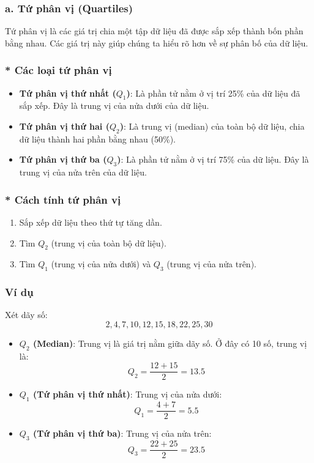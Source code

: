 \subsubsection{a. Tứ phân vị (Quartiles)}
Tứ phân vị là các giá trị chia một tập dữ liệu đã được sắp xếp thành bốn phần bằng nhau. Các giá trị này giúp chúng ta hiểu rõ hơn về sự phân bố của dữ liệu.

\subsubsection*{* Các loại tứ phân vị}
\begin{itemize}
    \item \textbf{Tứ phân vị thứ nhất ($Q_1$)}: Là phần tử nằm ở vị trí 25\% của dữ liệu đã sắp xếp. Đây là trung vị của nửa dưới của dữ liệu.
    \item \textbf{Tứ phân vị thứ hai ($Q_2$)}: Là trung vị (median) của toàn bộ dữ liệu, chia dữ liệu thành hai phần bằng nhau (50\%).
    \item \textbf{Tứ phân vị thứ ba ($Q_3$)}: Là phần tử nằm ở vị trí 75\% của dữ liệu. Đây là trung vị của nửa trên của dữ liệu.
\end{itemize}

\subsubsection*{* Cách tính tứ phân vị}
\begin{enumerate}
    \item Sắp xếp dữ liệu theo thứ tự tăng dần.
    \item Tìm $Q_2$ (trung vị của toàn bộ dữ liệu).
    \item Tìm $Q_1$ (trung vị của nửa dưới) và $Q_3$ (trung vị của nửa trên).
\end{enumerate}

\subsubsection{Ví dụ}
Xét dãy số:
\[2, 4, 7, 10, 12, 15, 18, 22, 25, 30\]
\begin{itemize}
    \item \textbf{$Q_2$ (Median)}: Trung vị là giá trị nằm giữa dãy số. Ở đây có 10 số, trung vị là:
    \[ Q_2 = \frac{12 + 15}{2} = 13.5 \]
    \item \textbf{$Q_1$ (Tứ phân vị thứ nhất)}: Trung vị của nửa dưới:
    \[ Q_1 = \frac{4 + 7}{2} = 5.5 \]
    \item \textbf{$Q_3$ (Tứ phân vị thứ ba)}: Trung vị của nửa trên:
    \[ Q_3 = \frac{22 + 25}{2} = 23.5 \]
\end{itemize}

